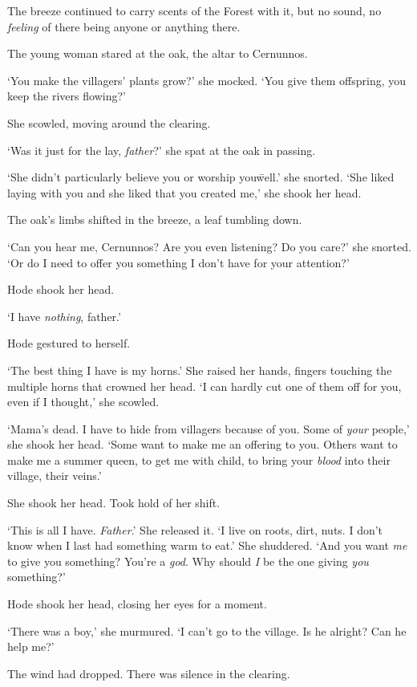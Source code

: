 The breeze continued to carry scents of the Forest with it, but no
sound, no \textit{feeling} of there being anyone or anything there.

The young woman stared at the oak, the altar to Cernunnos.

‘You make the villagers’ plants grow?’ she mocked. ‘You give them
offspring, you keep the rivers flowing?’

She scowled, moving around the clearing.

‘Was it just for the lay, \textit{father}?’ she spat at the oak in
passing.

‘She didn’t particularly believe you or worship you\=well.’ she
snorted. ‘She liked laying with you and she liked that you created
me,’ she shook her head.

The oak’s limbs shifted in the breeze, a leaf tumbling down.

‘Can you hear me, Cernunnos? Are you even listening? Do you care?’ she
snorted. ‘Or do I need to offer you something I don’t have for your
attention?’

Hode shook her head.

‘I have \textit{nothing}, father.’

Hode gestured to herself.

‘The best thing I have is my horns.’ She raised her hands, fingers
touching the multiple horns that crowned her head. ‘I can hardly cut
one of them off for you, even if I thought,’ she scowled.

‘Mama’s dead. I have to hide from villagers because of you. Some of
\textit{your} people,’ she shook her head. ‘Some want to make me an
offering to you. Others want to make me a summer queen, to get me with
child, to bring your \textit{blood} into their village, their veins.’

She shook her head. Took hold of her shift.

‘This is all I have. \textit{Father}.’ She released it. ‘I live on
roots, dirt, nuts. I don’t know when I last had something warm to
eat.’ She shuddered. ‘And you want \textit{me} to give you something?
You’re a \textit{god}. Why should \textit{I} be the one giving
\textit{you} something?’

Hode shook her head, closing her eyes for a moment.

‘There was a boy,’ she murmured. ‘I can’t go to the village. Is he
alright? Can he help me?’

The wind had dropped. There was silence in the clearing.

